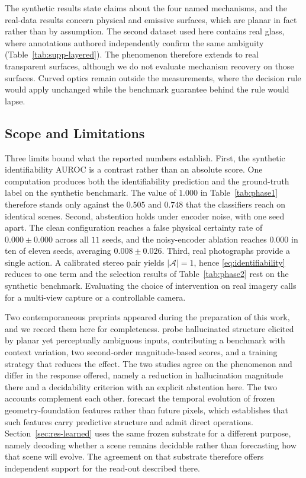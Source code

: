 \documentclass{article} %
\theoremstyle{defstyle}
\theoremstyle{plain}
\begin{document}
The synthetic results state claims about the four named mechanisms, and the real-data results
concern physical and emissive surfaces, which are planar in fact rather than by assumption. The
second dataset used here contains real glass, where annotations authored independently confirm
the same ambiguity (Table~\ref{tab:supp-layered}). The phenomenon therefore extends to real
transparent surfaces, although we do not evaluate mechanism recovery on those surfaces. Curved
optics remain outside the measurements, where the decision rule would apply unchanged while the
benchmark guarantee behind the rule would lapse.

\subsection{Scope and  Limitations}
\label{sec:supp-limits}
\label{sec:supp-concurrent}

Three limits bound what the reported numbers establish. First, the synthetic identifiability AUROC is a contrast rather than an absolute score. One
computation produces both the identifiability prediction and the ground-truth label on the
synthetic benchmark. The value of $1.000$ in Table~\ref{tab:phase1} therefore stands only
against the $0.505$ and $0.748$ that the classifiers reach on identical scenes. Second, abstention holds under encoder noise, with one seed apart. The clean configuration
reaches a false physical certainty rate of $0.000 \pm 0.000$ across all $11$ seeds, and the
noisy-encoder ablation reaches $0.000$ in ten of eleven seeds, averaging $0.008 \pm 0.026$. Third, real photographs provide a single action. A calibrated stereo pair yields
$|\mathcal{A}| = 1$, hence \eqref{eq:identifiability} reduces to one term and the selection
results of Table~\ref{tab:phase2} rest on the synthetic benchmark. Evaluating the choice of
intervention on real imagery calls for a multi-view capture or a controllable camera.

Two contemporaneous preprints appeared during the preparation of this work, and we record them
here for completeness. \citet{mirage2026} probe hallucinated structure elicited by planar yet
perceptually ambiguous inputs, contributing a benchmark with context variation, two
second-order magnitude-based scores, and a training strategy that reduces the effect. The two
studies agree on the phenomenon and differ in the response offered, namely a reduction in
hallucination magnitude there and a decidability criterion with an explicit abstention here.
The two accounts complement each other. \citet{vggtworld2026} forecast the temporal evolution
of frozen geometry-foundation features rather than future pixels, which establishes that such
features carry predictive structure and admit direct operations. Section~\ref{sec:res-learned}
uses the same frozen substrate for a different purpose, namely decoding whether a scene remains
decidable rather than forecasting how that scene will evolve. The agreement on that substrate
therefore offers independent support for the read-out described there.
\end{document}
